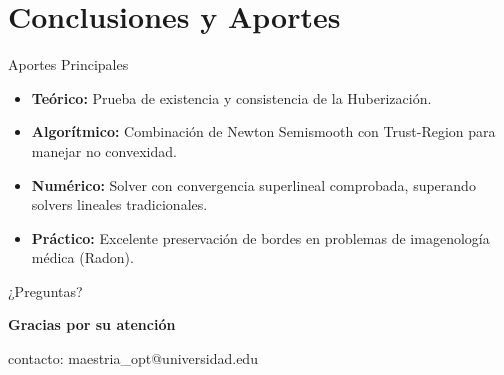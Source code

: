 \documentclass[10pt, aspectratio=169, xcolor={dvipsnames}]{beamer}
\begin{document}
\section{Conclusiones y Aportes}

\begin{frame}{Aportes Principales}
    \begin{itemize}
        \item \textbf{Teórico:} Prueba de existencia y consistencia de la Huberización.
        \item \textbf{Algorítmico:} Combinación de Newton Semismooth con Trust-Region para manejar no convexidad.
        \item \textbf{Numérico:} Solver con convergencia superlineal comprobada, superando solvers lineales tradicionales.
        \item \textbf{Práctico:} Excelente preservación de bordes en problemas de imagenología médica (Radon).
    \end{itemize}
\end{frame}

\begin{frame}
    \centering
    \Huge \textcolor{primary}{¿Preguntas?}
    
    \vspace{1cm}
    \large \textbf{Gracias por su atención}
    \vspace{0.5cm}
    
    \footnotesize contacto: maestria\_opt@universidad.edu
\end{frame}
\end{document}
